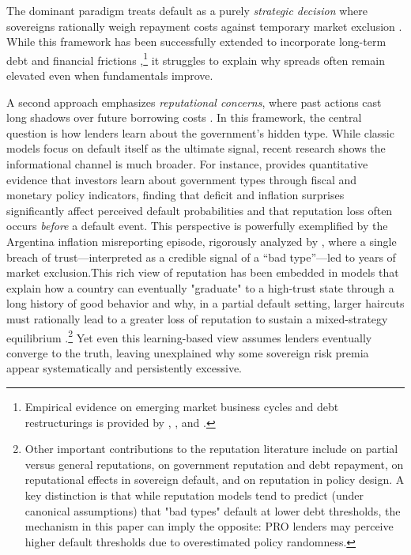 \documentclass[12pt]{article}
\theoremstyle{plain}
\begin{document}
The dominant paradigm treats default as a purely \textit{strategic decision}
where sovereigns rationally weigh repayment costs against temporary market
exclusion \citet{EatonGersovitz1981, AguiarGopinath2007, Arellano2008}. While
this framework has been successfully extended to incorporate long-term debt and
financial frictions \citet{HatchondoMartinez2009, ChatterjeeEyigungor2012,
	MendozaYue2012},\footnote{Empirical evidence on emerging market business cycles
	and debt restructurings is provided by \citet{NeumeyerPerri2005},
	\citet{CrucesTrebesch2013}, and \citet{ArellanoRamanarayanan2012}.} it
struggles to explain why spreads often remain elevated even when fundamentals
improve.

A second approach emphasizes \textit{reputational concerns}, where past actions
cast long shadows over future borrowing costs \citet{ColeDowEnglish1995,
	Phelan2006}. In this framework, the central question is how lenders learn about
the government's hidden type. While classic models focus on default itself as
the ultimate signal, recent research shows the informational channel is much
broader. For instance, \citet{Fourakis2021} provides quantitative evidence that
investors learn about government types through fiscal and monetary policy
indicators, finding that deficit and inflation surprises significantly affect
perceived default probabilities and that reputation loss often occurs
\textit{before} a default event. This perspective is powerfully exemplified by
the Argentina inflation misreporting episode, rigorously analyzed by
\citet{MorelliMoretti2023}, where a single breach of trust—interpreted as a
credible signal of a ``bad type''—led to years of market exclusion.This rich
view of reputation has been embedded in models that explain how a country can
eventually "graduate" to a high-trust state through a long history of good
behavior \citet{AmadorPhelan2021} and why, in a partial default setting, larger
haircuts must rationally lead to a greater loss of reputation to sustain a
mixed-strategy equilibrium \citet{AmadorPhelan2023}.\footnote{Other important
	contributions to the reputation literature include \citet{ColeKehoe1998} on
	partial versus general reputations, \citet{DErasmo2011} on government
	reputation and debt repayment, \citet{EgorovFabinger2016} on reputational
	effects in sovereign default, and \citet{DovisKirpalani2020,
		DovisKirpalani2021} on reputation in policy design. A key distinction is that
	while reputation models tend to predict (under canonical assumptions) that "bad
	types" default at lower debt thresholds, the mechanism in this paper can imply
	the opposite: PRO lenders may perceive higher default thresholds due to
	overestimated policy randomness.} Yet even this learning-based view assumes
lenders eventually converge to the truth, leaving unexplained why some
sovereign risk premia appear systematically and persistently excessive.
\end{document}
